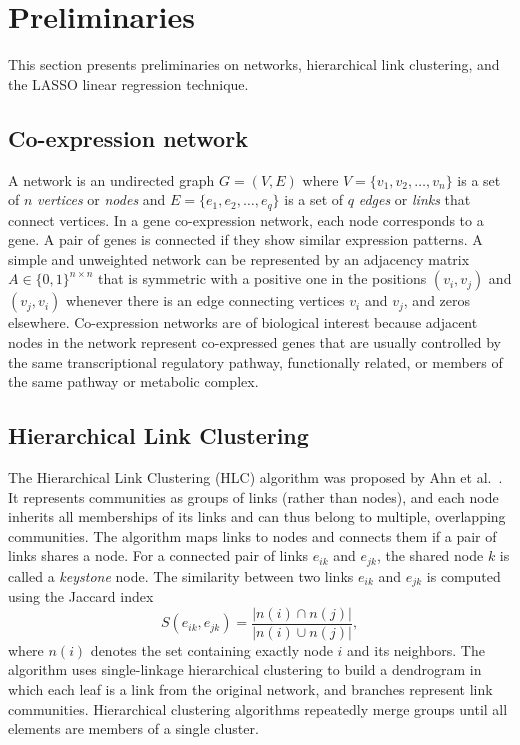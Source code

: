 \documentclass{bmcart}
\begin{document}
\section*{Preliminaries}
\label{sec.prelim}

This section presents preliminaries on networks, hierarchical link
clustering, and the LASSO linear regression technique.

\subsection*{Co-expression network}

A network is an undirected graph $G=(V,E)$ where
${V=\{v_1,v_2,\ldots,v_{n}\}}$ is a set of $n$ \textit{vertices} or
\textit{nodes} and ${E=\{e_1,e_2,\ldots,e_q\}}$ is a set of $q$
\textit{edges} or \textit{links} that connect vertices. In a gene
co-expression network, each node corresponds to a gene. A pair of
genes is connected if they show similar expression patterns. A simple
and unweighted network can be represented by an adjacency matrix $A
\in \{0,1\}^{n \times n}$ that is symmetric with a positive one in the
positions $(v_i,v_j)$ and $(v_j,v_i)$ whenever there is an edge
connecting vertices $v_i$ and $v_j$, and zeros
elsewhere. Co-expression networks are of biological interest because
adjacent nodes in the network represent co-expressed genes that are
usually controlled by the same transcriptional regulatory pathway,
functionally related, or members of the same pathway or metabolic
complex.


\subsection*{Hierarchical Link Clustering}

The Hierarchical Link Clustering (HLC) algorithm was proposed by Ahn
et al.~\cite{ahn2010link}. It represents communities as
groups of links (rather than nodes), and each node inherits all
memberships of its links and can thus belong to multiple, overlapping
communities. The algorithm maps links to nodes and connects them if a pair of
links shares a node. For a connected pair of links $e_{ik}$ and $e_{jk}$,
the shared node $k$ is called a \textit{keystone} node. 
The similarity between two links $e_{ik}$ and
$e_{jk}$ is computed using the Jaccard index
%
\begin{equation}\label{eq:jaccard}
  S(e_{ik},e_{jk}) = \frac{\vert n(i) \cap n(j) \vert}{\vert n(i) \cup n(j) \vert},
\end{equation}
%
where $n(i)$ denotes the set containing exactly node $i$ and its
neighbors. The algorithm uses single-linkage hierarchical clustering
to build a dendrogram in which each leaf is a link from the original
network, and branches represent link communities. Hierarchical
clustering algorithms repeatedly merge groups until all elements are
members of a single cluster.
\vspace{0.5cm}
\end{document}
